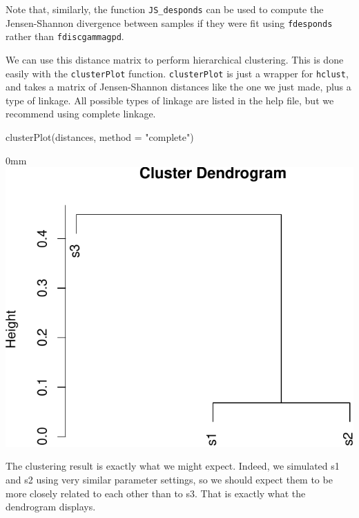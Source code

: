 \documentclass[]{article}
\newcommand{\hlstr}[1]{\textcolor[rgb]{0.251,0.627,0.251}{#1}}%
\newcommand{\hlstd}[1]{\textcolor[rgb]{0.251,0.251,0.251}{#1}}%
\newcommand{\hlkwc}[1]{\textcolor[rgb]{0.251,0.251,0.251}{#1}}%
\newcommand{\hlkwd}[1]{\textcolor[rgb]{0.878,0.439,0.125}{#1}}%
\newenvironment{Shaded}{\begin{myshaded}}{\end{myshaded}}
\newcommand{\KeywordTok}[1]{\hlkwd{#1}}
\newcommand{\DataTypeTok}[1]{\hlkwc{#1}}
\newcommand{\StringTok}[1]{\hlstr{#1}}
\newcommand{\NormalTok}[1]{\hlstd{#1}}
\theoremstyle{definition}
\theoremstyle{definition}
\theoremstyle{definition}
\theoremstyle{remark}
\begin{document}
Note that, similarly, the function \texttt{JS_desponds} can be used to
compute the Jensen-Shannon divergence between samples if they were fit
using \texttt{fdesponds} rather than \texttt{fdiscgammagpd}.

We can use this distance matrix to perform hierarchical clustering. This
is done easily with the \texttt{clusterPlot} function.
\texttt{clusterPlot} is just a wrapper for \texttt{hclust}, and takes a
matrix of Jensen-Shannon distances like the one we just made, plus a
type of linkage. All possible types of linkage are listed in the help
file, but we recommend using complete linkage.

\begin{Shaded}
\begin{Highlighting}[]
\KeywordTok{clusterPlot}\NormalTok{(distances, }\DataTypeTok{method =} \StringTok{"complete"}\NormalTok{)}
\end{Highlighting}
\end{Shaded}

\begin{adjustwidth}{\fltoffset}{0mm}
\includegraphics{powerTCR_files/figure-latex/unnamed-chunk-12-1} \end{adjustwidth}

The clustering result is exactly what we might expect. Indeed, we
simulated s1 and s2 using very similar parameter settings, so we should
expect them to be more closely related to each other than to s3. That is
exactly what the dendrogram displays.
\end{document}
